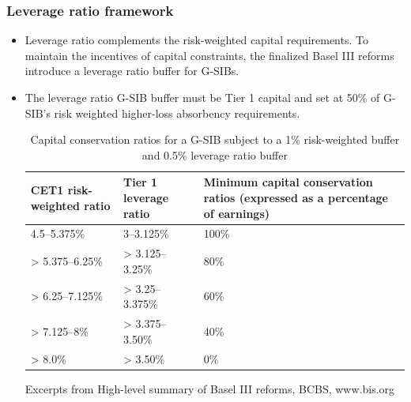 \subsubsection{Leverage ratio framework}
\begin{itemize}
\item Leverage ratio complements the risk-weighted capital requirements. To maintain the incentives of capital constraints, the finalized Basel III reforms introduce a leverage ratio buffer for G-SIBs.
\item The leverage ratio G-SIB buffer must be Tier 1 capital and set at 50\% of G-SIB's risk weighted higher-loss absorbency requirements.

\begin{table}[h]
    \centering
    \caption{Capital conservation ratios for a G-SIB subject to a 1\% risk-weighted buffer and 0.5\% leverage ratio buffer}
    \renewcommand{\arraystretch}{1.5} %

    \begin{tabular}{|p{5cm}|p{5cm}|p{5cm}|}
        \hline
        \textbf{CET1 risk-weighted ratio} & \textbf{Tier 1 leverage ratio} & \textbf{Minimum capital conservation ratios (expressed as a percentage of earnings)} \\
        \hline
        4.5–5.375\% & 3–3.125\% & 100\% \\
        \hline
        > 5.375–6.25\% & > 3.125–3.25\% & 80\% \\
        \hline
        > 6.25–7.125\% & > 3.25–3.375\% & 60\% \\
        \hline
        > 7.125–8\% & > 3.375–3.50\% & 40\% \\
        \hline
        > 8.0\% & > 3.50\% & 0\% \\
        \hline
    \end{tabular}
\end{table}
Excerpts from High-level summary of Basel III reforms, BCBS, www.bis.org



\end{itemize}


